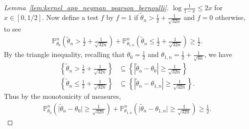 \documentclass[11pt,lof]{puthesis}
\renewcommand{\P}{\ensuremath{\mathbb{P}}}
\theoremstyle{break}
\theoremstyle{proof}
\newtheorem{proof}{Proof}
\begin{document}
\begin{proof}[Lemma~\ref{lem:kernel_app_neyman_pearson_bernoulli}]
  $\log \frac{1}{1-x} \leq 2x$
  for $x \in [0,1/2]$.
  Now define a test $f$ by
  $f = 1$ if $\tilde \theta_n > \frac{1}{2} + \frac{1}{\sqrt{32n}}$
  and $f=0$ otherwise,
  to see
  \begin{align*}
    \P_{\theta_0}^n \left(
      \tilde \theta_n > \frac{1}{2} + \frac{1}{\sqrt{32n}}
    \right)
    + \P_{\theta_{1,n}}^n \left(
      \tilde \theta_n \leq \frac{1}{2} + \frac{1}{\sqrt{32n}}
    \right)
    \geq \frac{1}{2}.
  \end{align*}
  By the triangle inequality,
  recalling that
  $\theta_0 = \frac{1}{2}$
  and $\theta_{1,n} = \frac{1}{2} + \frac{1}{\sqrt{8n}}$,
  we have
  \begin{align*}
    \left\{
      \tilde \theta_n > \frac{1}{2} + \frac{1}{\sqrt{32n}}
    \right\}
    &\subseteq
    \left\{
      \left| \tilde \theta_n - \theta_0 \right|
      \geq \frac{1}{\sqrt{32n}}
    \right\} \\
    \left\{
      \tilde \theta_n \leq \frac{1}{2} + \frac{1}{\sqrt{32n}}
    \right\}
    &\subseteq
    \left\{
      \left| \tilde \theta_n - \theta_{1,n} \right|
      \geq \frac{1}{\sqrt{32n}}
    \right\}.
  \end{align*}
  Thus by the monotonicity of measures,
  \begin{align*}
    \P_{\theta_0}^n \left(
      \big| \tilde \theta_n - \theta_0 \big|
      \geq \frac{1}{\sqrt{32n}}
    \right)
    + \P_{\theta_{1,n}}^n \left(
      \big| \tilde \theta_n - \theta_{1,n} \big|
      \geq \frac{1}{\sqrt{32n}}
    \right)
    \geq \frac{1}{2}.
  \end{align*}
\end{proof}
\end{document}
